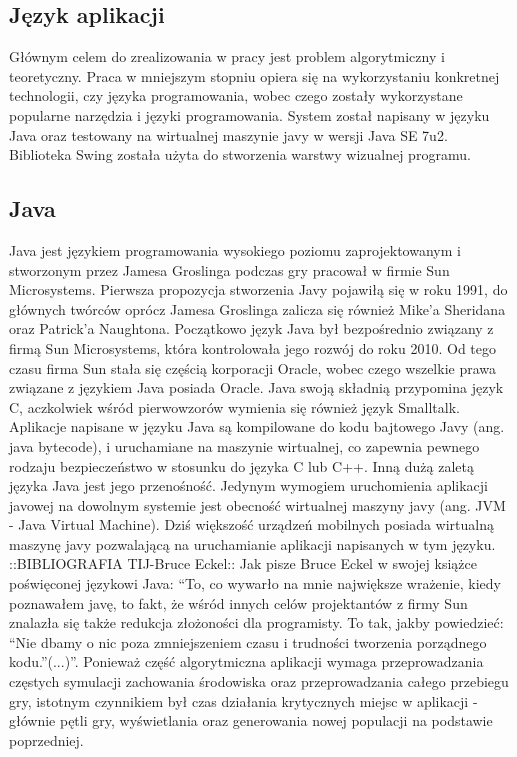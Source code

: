 \begin{par}
	\subsection{Język aplikacji}
	Głównym celem do zrealizowania w pracy jest problem algorytmiczny i teoretyczny.
	Praca w mniejszym stopniu opiera się na wykorzystaniu konkretnej technologii, czy języka programowania, wobec czego zostały wykorzystane popularne narzędzia i języki programowania.
	System został napisany w języku Java oraz testowany na wirtualnej maszynie javy w wersji Java SE 7u2. Biblioteka Swing została użyta do stworzenia warstwy wizualnej programu.
	\subsection{Java}
	Java jest językiem programowania wysokiego poziomu zaprojektowanym i stworzonym przez Jamesa Groslinga podczas gry pracował w firmie Sun Microsystems. Pierwsza propozycja stworzenia Javy pojawiłą się w roku 1991, do głównych twórców oprócz Jamesa Groslinga zalicza się również Mike'a Sheridana oraz Patrick'a Naughtona.
	Początkowo język Java był bezpośrednio związany z firmą Sun Microsystems, która kontrolowała jego rozwój do roku 2010.
	Od tego czasu firma Sun stała się częścią korporacji Oracle, wobec czego wszelkie prawa związane z językiem Java posiada Oracle.
	Java swoją składnią przypomina język C, aczkolwiek wśród pierwowzorów wymienia się również język Smalltalk.
	Aplikacje napisane w języku Java są kompilowane do kodu bajtowego Javy (ang. java bytecode), i uruchamiane na maszynie wirtualnej, co zapewnia pewnego rodzaju bezpieczeństwo w stosunku do języka C lub C++.
	Inną dużą zaletą języka Java jest jego przenośność.
	Jedynym wymogiem uruchomienia aplikacji javowej na dowolnym systemie jest obecność wirtualnej maszyny javy (ang. JVM - Java Virtual Machine).
	Dziś większość urządzeń mobilnych posiada wirtualną maszynę javy pozwalającą na uruchamianie aplikacji napisanych w tym języku.
	::BIBLIOGRAFIA TIJ-Bruce Eckel::
	Jak pisze Bruce Eckel w swojej książce poświęconej językowi Java: ``To, co wywarło na mnie największe wrażenie, kiedy poznawałem javę, to fakt, że wśród innych celów projektantów z firmy Sun znalazła się także redukcja złożoności dla programisty. 
	To tak, jakby powiedzieć: ``Nie dbamy o nic poza zmniejszeniem czasu i trudności tworzenia porządnego kodu.''(...)''.
	Ponieważ część algorytmiczna aplikacji wymaga przeprowadzania częstych symulacji zachowania środowiska oraz przeprowadzania całego przebiegu gry, istotnym czynnikiem był czas działania krytycznych miejsc w aplikacji - głównie pętli gry, wyświetlania oraz generowania nowej populacji na podstawie poprzedniej.

\end{par}
